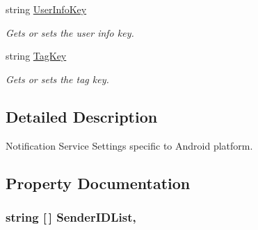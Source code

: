 \begin{DoxyCompactItemize}
string \hyperlink{class_voxel_busters_1_1_native_plugins_1_1_notification_service_settings_1_1_android_settings_ad699b1df7fea4928c313b2a6cf90a1a7}{User\+Info\+Key}
\begin{DoxyCompactList}\small\item\em Gets or sets the user info key. \end{DoxyCompactList}\item 
string \hyperlink{class_voxel_busters_1_1_native_plugins_1_1_notification_service_settings_1_1_android_settings_a0051a810f2402a2ceaac14c1e58dc3a3}{Tag\+Key}
\begin{DoxyCompactList}\small\item\em Gets or sets the tag key. \end{DoxyCompactList}\end{DoxyCompactItemize}


\subsection{Detailed Description}
Notification Service Settings specific to Android platform. 



\subsection{Property Documentation}
\hypertarget{class_voxel_busters_1_1_native_plugins_1_1_notification_service_settings_1_1_android_settings_a1f15bc21669f091d1513000272b9c137}{}
\subsubsection[{Sender\+I\+D\+List}]{\setlength{\rightskip}{0pt plus 5cm}string \mbox{[}$\,$\mbox{]} Sender\+I\+D\+List\hspace{0.3cm}{\ttfamily [get]}, {\ttfamily [set]}}\label{class_voxel_busters_1_1_native_plugins_1_1_notification_service_settings_1_1_android_settings_a1f15bc21669f091d1513000272b9c137}



